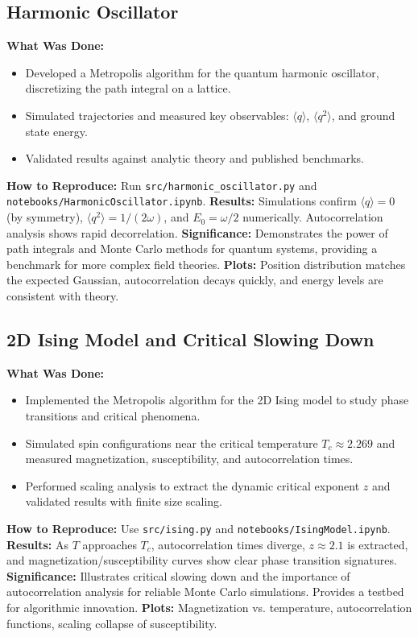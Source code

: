 \documentclass[12pt]{article}
\begin{document}
\subsection{Harmonic Oscillator}
\textbf{What Was Done:}
\begin{itemize}
    \item Developed a Metropolis algorithm for the quantum harmonic oscillator, discretizing the path integral on a lattice.
    \item Simulated trajectories and measured key observables: $\langle q \rangle$, $\langle q^2 \rangle$, and ground state energy.
    \item Validated results against analytic theory and published benchmarks.
\end{itemize}
\textbf{How to Reproduce:} Run \texttt{src/harmonic\_oscillator.py} and \texttt{notebooks/HarmonicOscillator.ipynb}.
\textbf{Results:} Simulations confirm $\langle q \rangle = 0$ (by symmetry), $\langle q^2 \rangle = 1/(2\omega)$, and $E_0 = \omega/2$ numerically. Autocorrelation analysis shows rapid decorrelation.
\textbf{Significance:} Demonstrates the power of path integrals and Monte Carlo methods for quantum systems, providing a benchmark for more complex field theories.
\textbf{Plots:} Position distribution matches the expected Gaussian, autocorrelation decays quickly, and energy levels are consistent with theory.

\subsection{2D Ising Model and Critical Slowing Down}
\textbf{What Was Done:}
\begin{itemize}
    \item Implemented the Metropolis algorithm for the 2D Ising model to study phase transitions and critical phenomena.
    \item Simulated spin configurations near the critical temperature $T_c \approx 2.269$ and measured magnetization, susceptibility, and autocorrelation times.
    \item Performed scaling analysis to extract the dynamic critical exponent $z$ and validated results with finite size scaling.
\end{itemize}
\textbf{How to Reproduce:} Use \texttt{src/ising.py} and \texttt{notebooks/IsingModel.ipynb}.
\textbf{Results:} As $T$ approaches $T_c$, autocorrelation times diverge, $z \approx 2.1$ is extracted, and magnetization/susceptibility curves show clear phase transition signatures.
\textbf{Significance:} Illustrates critical slowing down and the importance of autocorrelation analysis for reliable Monte Carlo simulations. Provides a testbed for algorithmic innovation.
\textbf{Plots:} Magnetization vs. temperature, autocorrelation functions, scaling collapse of susceptibility.
\end{document}
